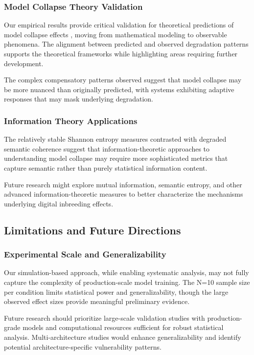 \documentclass[11pt]{article}
\begin{document}
\subsubsection{Model Collapse Theory Validation}

Our empirical results provide critical validation for theoretical predictions of model collapse effects \citep{shumailov2023curse, seddik2024bad}, moving from mathematical modeling to observable phenomena. The alignment between predicted and observed degradation patterns supports the theoretical frameworks while highlighting areas requiring further development.

The complex compensatory patterns observed suggest that model collapse may be more nuanced than originally predicted, with systems exhibiting adaptive responses that may mask underlying degradation.

\subsubsection{Information Theory Applications}

The relatively stable Shannon entropy measures contrasted with degraded semantic coherence suggest that information-theoretic approaches to understanding model collapse may require more sophisticated metrics that capture semantic rather than purely statistical information content.

Future research might explore mutual information, semantic entropy, and other advanced information-theoretic measures to better characterize the mechanisms underlying digital inbreeding effects.

\subsection{Limitations and Future Directions}

\subsubsection{Experimental Scale and Generalizability}

Our simulation-based approach, while enabling systematic analysis, may not fully capture the complexity of production-scale model training. The N=10 sample size per condition limits statistical power and generalizability, though the large observed effect sizes provide meaningful preliminary evidence.

Future research should prioritize large-scale validation studies with production-grade models and computational resources sufficient for robust statistical analysis. Multi-architecture studies would enhance generalizability and identify potential architecture-specific vulnerability patterns.
\end{document}
